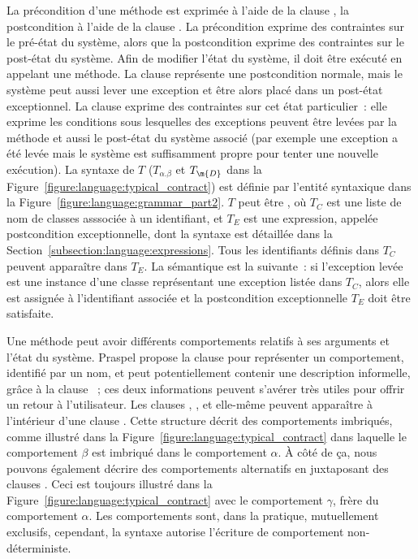 La précondition d'une méthode est exprimée à l'aide de la clause \arequires, la
postcondition à l'aide de la clause \aensures. La précondition exprime des
contraintes sur le {\strong pré-état} du système, alors que la postcondition
exprime des contraintes sur le {\strong post-état} du système. Afin de modifier
l'état du système, il doit être exécuté en appelant une méthode. La clause
\aensures représente une {\strong postcondition normale}, mais le système peut
aussi lever une exception et être alors placé dans un {\strong post-état
exceptionnel}. La clause \athrowable exprime des contraintes sur cet état
particulier~: elle exprime les conditions sous lesquelles des exceptions peuvent
être levées par la méthode et aussi le post-état du système associé (par exemple
une exception a été levée mais le système est suffisamment propre pour tenter
une nouvelle exécution). La syntaxe de $T$ ($T_{\alpha.\beta}$ et $T_\m{D}$ dans
la Figure~\ref{figure:language:typical_contract}) est définie par l'entité
syntaxique  dans la
Figure~\ref{figure:language:grammar_part2}. $T$ peut être , où $T_C$ est une liste de nom de classes asssociée à un identifiant, et
$T_E$ est une expression, appelée {\strong postcondition exceptionnelle}, dont
la syntaxe est détaillée dans la Section~\ref{subsection:language:expressions}.
Tous les identifiants définis dans $T_C$ peuvent apparaître dans $T_E$. La
sémantique est la suivante~: si l'exception levée est une instance d'une classe
représentant une exception listée dans $T_C$, alors elle est assignée à
l'identifiant associée et la postcondition exceptionnelle $T_E$ doit être
satisfaite.

Une méthode peut avoir différents {\strong comportements} relatifs à ses
arguments et l'état du système. Praspel propose la clause \abehavior pour
représenter un comportement, identifié par un nom, et peut potentiellement
contenir une description informelle, grâce à la clause \adescription~; ces deux
informations peuvent s'avérer très utiles pour offrir un retour à l'utilisateur.
Les clauses \arequires, \aensures, \athrowable et \abehavior elle-même peuvent
apparaître à l'intérieur d'une clause \abehavior. Cette structure décrit des
comportements {\strong imbriqués}, comme illustré dans la
Figure~\ref{figure:language:typical_contract} dans laquelle le comportement
$\beta$ est imbriqué dans le comportement $\alpha$. À côté de ça, nous pouvons
également décrire des comportements {\strong alternatifs} en juxtaposant des
clauses \abehavior. Ceci est toujours illustré dans la
Figure~\ref{figure:language:typical_contract} avec le comportement $\gamma$,
frère du comportement $\alpha$. Les comportements sont, dans la pratique,
{\strong mutuellement exclusifs}, cependant, la syntaxe autorise l'écriture de
comportement non-déterministe.

